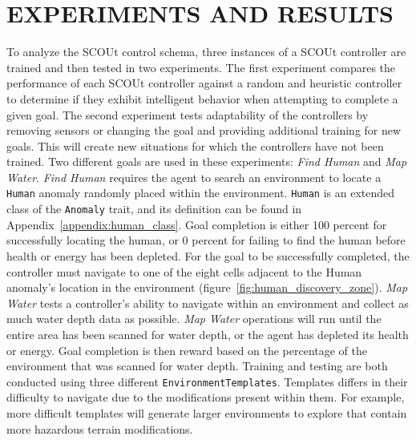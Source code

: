 

\chapter{EXPERIMENTS AND RESULTS} \label{ch:experiments_and_results}
To analyze the SCOUt control schema, three instances of a SCOUt controller are trained and then tested in two experiments.
The first experiment compares the performance of each SCOUt controller against a random and heuristic controller to determine if they exhibit intelligent behavior when attempting to complete a given goal.
The second experiment tests adaptability of the controllers by removing sensors or changing the goal and providing additional training for new goals.
This will create new situations for which the controllers have not been trained.
Two different goals are used in these experiments: \textit{Find Human} and \textit{Map Water}.
\textit{Find Human} requires the agent to search an environment to locate a \texttt{Human} anomaly randomly placed within the environment.
\texttt{Human} is an extended class of the \texttt{Anomaly} trait, and its definition can be found in Appendix~\ref{appendix:human_class}.
Goal completion is either 100 percent for successfully locating the human, or 0 percent for failing to find the human before health or energy has been depleted.
For the goal to be successfully completed, the controller must navigate to one of the eight cells adjacent to the Human anomaly's location in the environment (figure~\ref{fig:human_discovery_zone}).
\textit{Map Water} tests a controller's ability to navigate within an environment and collect as much water depth data as possible.
\textit{Map Water} operations will run until the entire area has been scanned for water depth, or the agent has depleted its health or energy.
Goal completion is then reward based on the percentage of the environment that was scanned for water depth.
Training and testing are both conducted using three different \texttt{EnvironmentTemplates}.
Templates differs in their difficulty to navigate due to the modifications present within them.
For example, more difficult templates will generate larger environments to explore that contain more hazardous terrain modifications.

